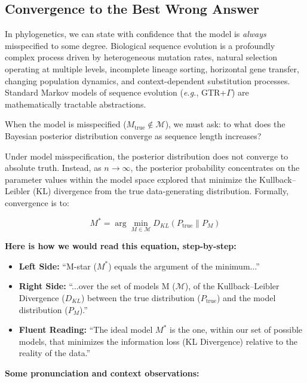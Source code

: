 \subsection{Convergence to the Best Wrong Answer}

In phylogenetics, we can state with confidence that the model is \textit{always} misspecified to some degree. Biological sequence evolution is a profoundly complex process driven by heterogeneous mutation rates, natural selection operating at multiple levels, incomplete lineage sorting, horizontal gene transfer, changing population dynamics, and context-dependent substitution processes. Standard Markov models of sequence evolution (\textit{e.g.}, GTR+$\Gamma$) are mathematically tractable abstractions.

When the model is misspecified ($M_{\text{true}} \notin \mathcal{M}$), we must ask: to what does the Bayesian posterior distribution converge as sequence length increases?

Under model misspecification, the posterior distribution does not converge to absolute truth. Instead, as $n \to \infty$, the posterior probability concentrates on the parameter values within the model space explored that minimize the Kullback--Leibler (KL) divergence from the true data-generating distribution. Formally, convergence is to:

$$M^* = \arg\min_{M \in \mathcal{M}} D_{KL}(P_{\text{true}} \| P_M)$$

\textbf{Here is how we would read this equation, step-by-step:}

\begin{itemize}
    \item \textbf{Left Side:} ``M-star ($M^*$) equals the argument of the minimum...''
    \item \textbf{Right Side:} ``...over the set of models M ($\mathcal{M}$), of the Kullback--Leibler Divergence ($D_{KL}$) between the true distribution ($P_{\text{true}}$) and the model distribution ($P_M$).''
    \item \textbf{Fluent Reading:} ``The ideal model $M^*$ is the one, within our set of possible models, that minimizes the information loss (KL Divergence) relative to the reality of the data.''
\end{itemize}

\vspace{0.5cm}

\textbf{Some pronunciation and context observations:}

